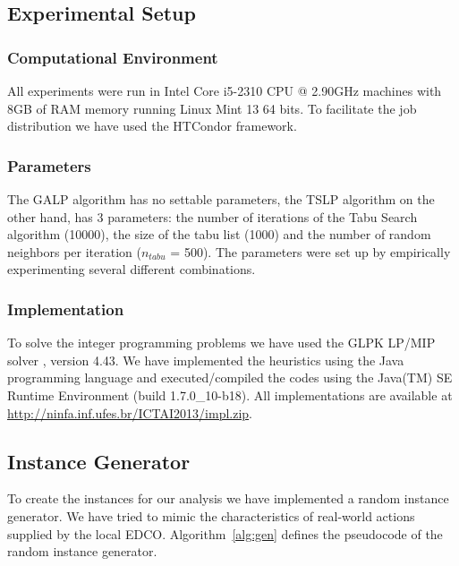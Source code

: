 
\subsection{Experimental Setup}
\subsubsection{Computational Environment}
All experiments were run in Intel Core i5-2310 CPU @ 2.90GHz machines
with 8GB of RAM memory running Linux Mint 13 64 bits.  To facilitate the job distribution we have used the HTCondor framework.

\subsubsection{Parameters}
The GALP algorithm has no settable parameters, the TSLP algorithm on the other hand,
has 3 parameters: the number of iterations of the Tabu Search algorithm (10000),
the size of the tabu list (1000) and the number of random neighbors per iteration
($n_{tabu}$ = 500).
The parameters were set up by empirically experimenting several different combinations.

\subsubsection{Implementation}
To solve the integer programming problems we have used the GLPK LP/MIP solver \cite{GLPK},
version 4.43. We have implemented the heuristics using the Java programming language and
executed/compiled the codes using the Java(TM) SE Runtime Environment (build 1.7.0\_10-b18).
All implementations are available at \url{http://ninfa.inf.ufes.br/ICTAI2013/impl.zip}. 

\subsection{Instance Generator}
To create the instances for our analysis we have implemented a random instance generator.
We have tried to mimic the characteristics of real-world actions supplied by the local EDCO.
Algorithm~\ref{alg:gen} defines the pseudocode of the random instance generator.

